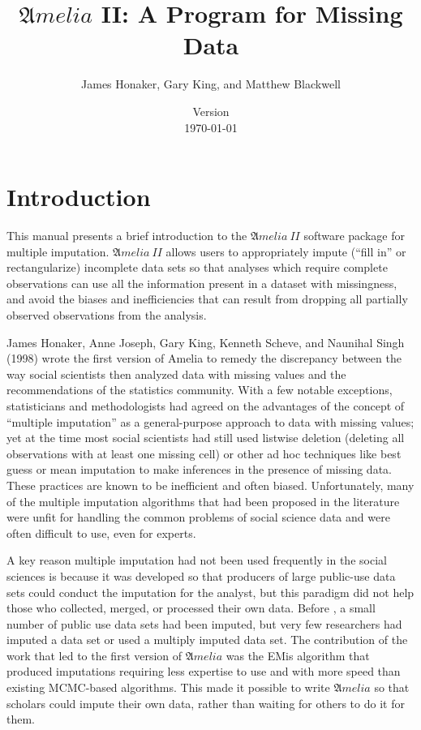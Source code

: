 \documentclass[12pt,titlepage]{article}
\title{${\mathfrak Amelia}$ II: A Program for Missing Data}
\date{Version \\ \today}
\author{James Honaker, Gary King, and Matthew Blackwell}
\newcommand{\Amelia}{\ensuremath{\mathfrak Amelia} }
\newcommand{\AmeliaII}{\ensuremath{\mathfrak Amelia~II} }
\begin{document}
\maketitle

\tableofcontents
\newpage



\section{Introduction}
\label{sec:intro}

This manual presents a brief introduction to the \AmeliaII software
package for multiple imputation.  \AmeliaII allows users to
appropriately impute (``fill in'' or rectangularize) incomplete data
sets so that analyses which require complete observations can use all
the information present in a dataset with missingness, and avoid the
biases and inefficiencies that can result from dropping all partially
observed observations from the analysis.

James Honaker, Anne Joseph, Gary King, Kenneth Scheve, and Naunihal
Singh (1998) wrote the first version of Amelia to remedy the
discrepancy between the way social scientists then analyzed data with
missing values and the recommendations of the statistics community.
With a few notable exceptions, statisticians and methodologists had
agreed on the advantages of the concept of ``multiple imputation'' as
a general-purpose approach to data with missing values; yet at the
time most social scientists had still used listwise deletion (deleting
all observations with at least one missing cell) or other ad hoc
techniques like best guess or mean imputation to make inferences in
the presence of missing data.  These practices are known to be
inefficient and often biased.  Unfortunately, many of the multiple
imputation algorithms that had been proposed in the literature were
unfit for handling the common problems of social science data and were
often difficult to use, even for experts.

A key reason multiple imputation had not been used frequently in the
social sciences is because it was developed so that producers of large
public-use data sets could conduct the imputation for the analyst, but
this paradigm did not help those who collected, merged, or processed
their own data.  Before \citet*{KinHonJos01}, a small number of public
use data sets had been imputed, but very few researchers had imputed a
data set or used a multiply imputed data set.  The contribution of the
work that led to the first version of \Amelia was the EMis algorithm
that produced imputations requiring less expertise to use and with
more speed than existing MCMC-based algorithms.  This made it possible
to write \Amelia so that scholars could impute their own data, rather
than waiting for others to do it for them.
\end{document}
